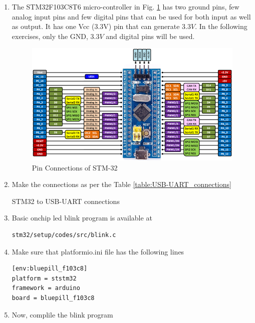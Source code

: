 \begin{enumerate}[label=\arabic*.,ref=\theenumi]
\item The STM32F103C8T6 micro-controller in Fig. \ref{fig:stm_blue} has two ground pins, few analog input pins and few digital pins that can be used for both input as well as output. It has one Vcc (3.3V) pin that can generate 3.3$V$.  In the following exercises, only the GND, 3.3$V$ and digital pins will be used.
%
\begin{figure}[!htb]
\begin{center}
\includegraphics[width=\columnwidth]{stm32/sevenseg/figs/stm_blue}
\end{center}
\caption{Pin Connections of STM-32}
\label{fig:stm_blue}
\end{figure}
\item Make the connections as per the Table \ref{table:USB-UART_connections}
\begin{table}[!h]
\centering

\caption{STM32 to USB-UART connections}
\label{table:USB-UART_connections}
\end{table}
\item Basic onchip led blink program is available at 
\begin{lstlisting}
stm32/setup/codes/src/blink.c
\end{lstlisting}
\item Make sure that platformio.ini file has the following lines
\begin{lstlisting}
[env:bluepill_f103c8]
platform = ststm32
framework = arduino
board = bluepill_f103c8
\end{lstlisting}
\item Now, complile the blink program

\end{enumerate}
